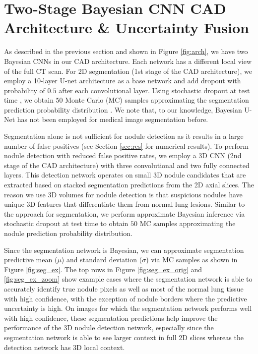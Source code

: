 \documentclass{article}
\begin{document}
\section{Two-Stage Bayesian CNN CAD Architecture \& Uncertainty Fusion}%





As described in the previous section and shown in Figure \ref{fig:arch}, we have two Bayesian CNNs in our CAD architecture. Each network has a different local view of the full CT scan. 
For 2D segmentation (1st stage of the CAD architecture), we employ a 10-layer U-net architecture \cite{unet_miccai15} as a base network and add dropout with probability of $0.5$ after each convolutional layer. Using stochastic dropout at test time \cite{gal_icml16, gal_iclr16}, we obtain $50$ Monte Carlo (MC) samples approximating the segmentation prediction probability distribution \cite{Kendall2015BayesianSM}. We note that, to our knowledge, Bayesian U-Net has not been employed for medical image segmentation before.

Segmentation alone is not sufficient for nodule detection as it results in a large number of false positives (see Section \ref{sec:res} for numerical results). To perform nodule detection with reduced false positive rates, we employ a 3D CNN (2nd stage of the CAD architecture) with three convolutional and two fully connected layers. This detection network operates on small 3D nodule candidates that are extracted based on stacked segmentation predictions from the 2D axial slices. The reason we use 3D volumes for nodule detection is that suspicious nodules have unique 3D features that differentiate them from normal lung lesions. Similar to the approach for segmentation, we perform approximate Bayesian inference via stochastic dropout at test time to obtain $50$ MC samples approximating the nodule prediction probability distribution. 

Since the segmentation network is Bayesian, we can approximate segmentation predictive mean ($\mu$) and standard deviation ($\sigma$) via MC samples as shown in Figure \ref{fig:seg_ex}. The top rows in Figure \ref{fig:seg_ex_orig} and \ref{fig:seg_ex_zoom} show example cases where the segmentation network is able to accurately identify true nodule pixels as well as most of the normal lung tissue with high confidence, with the exception of nodule borders where the predictive uncertainty is high. 
On images for which the segmentation network performs well with high confidence, these segmentation predictions help improve the performance of the 3D nodule detection network, especially since the segmentation network is able to see larger context in full 2D slices whereas the detection network has 3D local context. 
\end{document}
